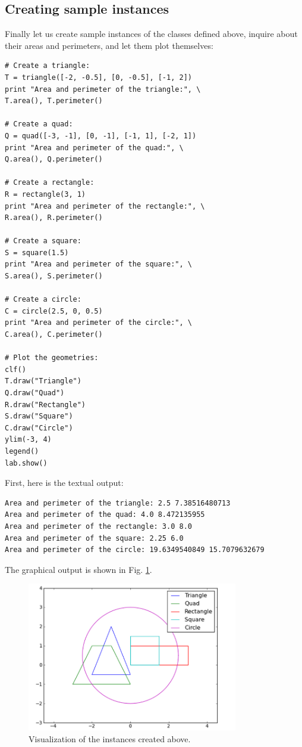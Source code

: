 \subsection{Creating sample instances}

Finally let us create sample instances of the classes defined above, inquire
about their areas and perimeters, and let them plot themselves:

\begin{verbatim}
# Create a triangle:
T = triangle([-2, -0.5], [0, -0.5], [-1, 2])
print "Area and perimeter of the triangle:", \
T.area(), T.perimeter()

# Create a quad:
Q = quad([-3, -1], [0, -1], [-1, 1], [-2, 1])
print "Area and perimeter of the quad:", \
Q.area(), Q.perimeter()
 
# Create a rectangle:
R = rectangle(3, 1)
print "Area and perimeter of the rectangle:", \
R.area(), R.perimeter()

# Create a square:
S = square(1.5)
print "Area and perimeter of the square:", \
S.area(), S.perimeter()
 
# Create a circle:
C = circle(2.5, 0, 0.5)
print "Area and perimeter of the circle:", \
C.area(), C.perimeter()

# Plot the geometries:
clf()
T.draw("Triangle")
Q.draw("Quad")
R.draw("Rectangle")
S.draw("Square")
C.draw("Circle")
ylim(-3, 4)
legend()
lab.show()
\end{verbatim}
First, here is the textual output:

\begin{verbatim}
Area and perimeter of the triangle: 2.5 7.38516480713
Area and perimeter of the quad: 4.0 8.472135955
Area and perimeter of the rectangle: 3.0 8.0
Area and perimeter of the square: 2.25 6.0
Area and perimeter of the circle: 19.6349540849 15.7079632679
\end{verbatim}
The graphical output is shown in Fig. \ref{fig:classes2}.

\begin{figure}[!ht]
\begin{center}
\includegraphics[width=0.82\textwidth]{imgp/classes2.png}
\end{center}
\vspace{-2mm}
\caption{Visualization of the instances created above.}
\label{fig:classes2}
\end{figure}

